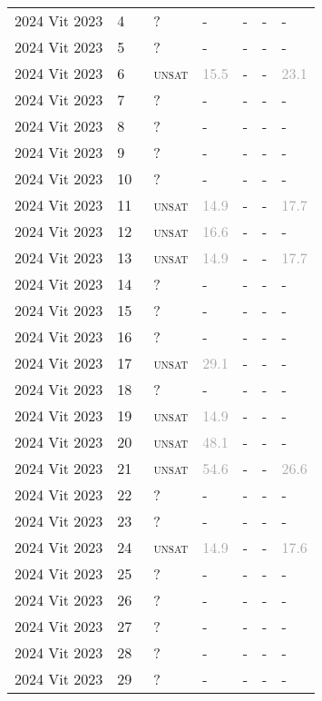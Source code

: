 \begin{center}
{\begin{longtable}{@{}lllllll@{}}
2024 Vit 2023 & 4 & ~? & - & - & - & - \\
2024 Vit 2023 & 5 & ~? & - & - & - & - \\
2024 Vit 2023 & 6 & ~\textsc{unsat} & \textcolor{darkgray}{15.5} & - & - & \textcolor{darkgray}{23.1} \\
2024 Vit 2023 & 7 & ~? & - & - & - & - \\
2024 Vit 2023 & 8 & ~? & - & - & - & - \\
2024 Vit 2023 & 9 & ~? & - & - & - & - \\
2024 Vit 2023 & 10 & ~? & - & - & - & - \\
2024 Vit 2023 & 11 & ~\textsc{unsat} & \textcolor{darkgray}{14.9} & - & - & \textcolor{darkgray}{17.7} \\
2024 Vit 2023 & 12 & ~\textsc{unsat} & \textcolor{darkgray}{16.6} & - & - & - \\
2024 Vit 2023 & 13 & ~\textsc{unsat} & \textcolor{darkgray}{14.9} & - & - & \textcolor{darkgray}{17.7} \\
2024 Vit 2023 & 14 & ~? & - & - & - & - \\
2024 Vit 2023 & 15 & ~? & - & - & - & - \\
2024 Vit 2023 & 16 & ~? & - & - & - & - \\
2024 Vit 2023 & 17 & ~\textsc{unsat} & \textcolor{darkgray}{29.1} & - & - & - \\
2024 Vit 2023 & 18 & ~? & - & - & - & - \\
2024 Vit 2023 & 19 & ~\textsc{unsat} & \textcolor{darkgray}{14.9} & - & - & - \\
2024 Vit 2023 & 20 & ~\textsc{unsat} & \textcolor{darkgray}{48.1} & - & - & - \\
2024 Vit 2023 & 21 & ~\textsc{unsat} & \textcolor{darkgray}{54.6} & - & - & \textcolor{darkgray}{26.6} \\
2024 Vit 2023 & 22 & ~? & - & - & - & - \\
2024 Vit 2023 & 23 & ~? & - & - & - & - \\
2024 Vit 2023 & 24 & ~\textsc{unsat} & \textcolor{darkgray}{14.9} & - & - & \textcolor{darkgray}{17.6} \\
2024 Vit 2023 & 25 & ~? & - & - & - & - \\
2024 Vit 2023 & 26 & ~? & - & - & - & - \\
2024 Vit 2023 & 27 & ~? & - & - & - & - \\
2024 Vit 2023 & 28 & ~? & - & - & - & - \\
2024 Vit 2023 & 29 & ~? & - & - & - & - \\

\end{longtable}}
\end{center}
